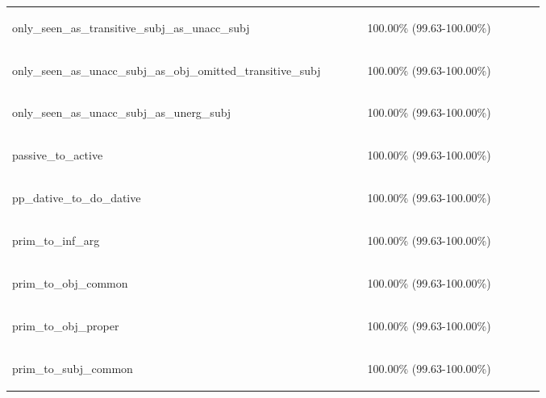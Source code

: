 \documentclass[11pt]{article}
\begin{document}
\begin{table}
\begin{tabular}{p{0.6\linewidth} p{0.3\linewidth}}
\begin{tiny}only\_seen\_as\_transitive\_subj\_as\_unacc\_subj\end{tiny} & \begin{tiny} 100.00\% (99.63-100.00\%)\end{tiny} \\
\begin{tiny}only\_seen\_as\_unacc\_subj\_as\_obj\_omitted\_transitive\_subj\end{tiny} & \begin{tiny} 100.00\% (99.63-100.00\%)\end{tiny} \\
\begin{tiny}only\_seen\_as\_unacc\_subj\_as\_unerg\_subj\end{tiny} & \begin{tiny} 100.00\% (99.63-100.00\%)\end{tiny} \\
\begin{tiny}passive\_to\_active\end{tiny} & \begin{tiny} 100.00\% (99.63-100.00\%)\end{tiny} \\
\begin{tiny}pp\_dative\_to\_do\_dative\end{tiny} & \begin{tiny} 100.00\% (99.63-100.00\%)\end{tiny} \\
\begin{tiny}prim\_to\_inf\_arg\end{tiny} & \begin{tiny} 100.00\% (99.63-100.00\%)\end{tiny} \\
\begin{tiny}prim\_to\_obj\_common\end{tiny} & \begin{tiny} 100.00\% (99.63-100.00\%)\end{tiny} \\
\begin{tiny}prim\_to\_obj\_proper\end{tiny} & \begin{tiny} 100.00\% (99.63-100.00\%)\end{tiny} \\
\begin{tiny}prim\_to\_subj\_common\end{tiny} & \begin{tiny} 100.00\% (99.63-100.00\%)\end{tiny} \\

\end{tabular}
\end{table}
\end{document}
